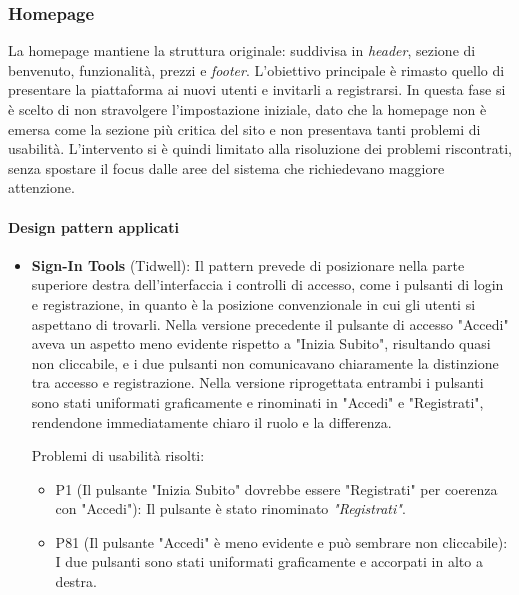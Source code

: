 \subsubsection{Homepage}
La homepage mantiene la struttura originale: suddivisa in \textit{header}, sezione di benvenuto, funzionalità, prezzi e \textit{footer}. L'obiettivo principale è rimasto quello di presentare la piattaforma ai nuovi utenti e invitarli a registrarsi. In questa fase si è scelto di non stravolgere l'impostazione iniziale, dato che la homepage non è emersa come la sezione più critica del sito e non presentava tanti problemi di usabilità. L'intervento si è quindi limitato alla risoluzione dei problemi riscontrati, senza spostare il focus dalle aree del sistema che richiedevano maggiore attenzione.

\paragraph{Design pattern applicati}

\begin{itemize}
    \item \textbf{Sign-In Tools} (Tidwell): Il pattern prevede di posizionare nella parte superiore destra dell'interfaccia i controlli di accesso, come i pulsanti di login e registrazione, in quanto è la posizione convenzionale in cui gli utenti si aspettano di trovarli. Nella versione precedente il pulsante di accesso "Accedi" aveva un aspetto meno evidente rispetto a "Inizia Subito", risultando quasi non cliccabile, e i due pulsanti non comunicavano chiaramente la distinzione tra accesso e registrazione. Nella versione riprogettata entrambi i pulsanti sono stati uniformati graficamente e rinominati in "Accedi" e "Registrati", rendendone immediatamente chiaro il ruolo e la differenza.

    Problemi di usabilità risolti:
    \begin{itemize}
        \item P1 (Il pulsante "Inizia Subito" dovrebbe essere "Registrati" per coerenza con "Accedi"): Il pulsante è stato rinominato \textit{"Registrati"}.
        \item P81 (Il pulsante "Accedi" è meno evidente e può sembrare non cliccabile): I due pulsanti sono stati uniformati graficamente e accorpati in alto a destra.
    \end{itemize}

\end{itemize}

